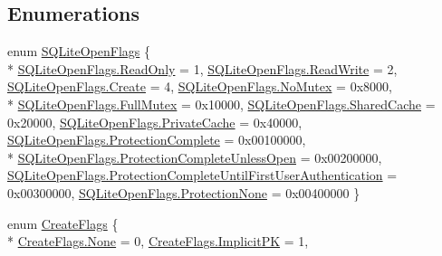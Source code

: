 \subsection*{Enumerations}
\begin{DoxyCompactItemize}
\item 
enum \hyperlink{namespace_s_q_lite_a9d72cc097c53dbc96a6f0eec530cc439}{S\+Q\+Lite\+Open\+Flags} \{ \\*
\hyperlink{namespace_s_q_lite_a9d72cc097c53dbc96a6f0eec530cc439a131fb182a881796e7606ed6da27f1197}{S\+Q\+Lite\+Open\+Flags.\+Read\+Only} = 1, 
\hyperlink{namespace_s_q_lite_a9d72cc097c53dbc96a6f0eec530cc439a70a2a84088d405a2e3f1e3accaa16723}{S\+Q\+Lite\+Open\+Flags.\+Read\+Write} = 2, 
\hyperlink{namespace_s_q_lite_a9d72cc097c53dbc96a6f0eec530cc439a686e697538050e4664636337cc3b834f}{S\+Q\+Lite\+Open\+Flags.\+Create} = 4, 
\hyperlink{namespace_s_q_lite_a9d72cc097c53dbc96a6f0eec530cc439aed897a216de36c7c934c4baa02b4fea7}{S\+Q\+Lite\+Open\+Flags.\+No\+Mutex} = 0x8000, 
\\*
\hyperlink{namespace_s_q_lite_a9d72cc097c53dbc96a6f0eec530cc439a3322fce9aa781563c086ffd3c13da8b4}{S\+Q\+Lite\+Open\+Flags.\+Full\+Mutex} = 0x10000, 
\hyperlink{namespace_s_q_lite_a9d72cc097c53dbc96a6f0eec530cc439add8141c2dbba4f369c304f748a6badf6}{S\+Q\+Lite\+Open\+Flags.\+Shared\+Cache} = 0x20000, 
\hyperlink{namespace_s_q_lite_a9d72cc097c53dbc96a6f0eec530cc439a54f0a906e1d7cbe43867c40793c22c91}{S\+Q\+Lite\+Open\+Flags.\+Private\+Cache} = 0x40000, 
\hyperlink{namespace_s_q_lite_a9d72cc097c53dbc96a6f0eec530cc439af6b459b732ab3369bd8fb1b31d3d019d}{S\+Q\+Lite\+Open\+Flags.\+Protection\+Complete} = 0x00100000, 
\\*
\hyperlink{namespace_s_q_lite_a9d72cc097c53dbc96a6f0eec530cc439ae16febbf8611e3d5db7ed971e2bcb0f7}{S\+Q\+Lite\+Open\+Flags.\+Protection\+Complete\+Unless\+Open} = 0x00200000, 
\hyperlink{namespace_s_q_lite_a9d72cc097c53dbc96a6f0eec530cc439ad729bc99ed371feb5cc190b05f417172}{S\+Q\+Lite\+Open\+Flags.\+Protection\+Complete\+Until\+First\+User\+Authentication} = 0x00300000, 
\hyperlink{namespace_s_q_lite_a9d72cc097c53dbc96a6f0eec530cc439a3c2d862f4536788c6b00eb3bbdcd81bf}{S\+Q\+Lite\+Open\+Flags.\+Protection\+None} = 0x00400000
 \}
\item 
enum \hyperlink{namespace_s_q_lite_a5ada328810363319c85c3e0c28c67479}{Create\+Flags} \{ \\*
\hyperlink{namespace_s_q_lite_a5ada328810363319c85c3e0c28c67479a6adf97f83acf6453d4a6a4b1070f3754}{Create\+Flags.\+None} = 0, 
\hyperlink{namespace_s_q_lite_a5ada328810363319c85c3e0c28c67479a7f37680f54478a209ab2d2ccd6ee9a2f}{Create\+Flags.\+Implicit\+P\+K} = 1, 

\end{DoxyCompactItemize}
